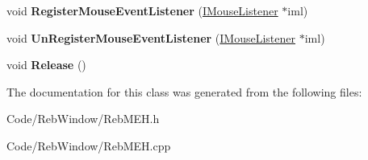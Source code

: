 \begin{DoxyCompactItemize}
\item 
void {\bfseries Register\+Mouse\+Event\+Listener} (\hyperlink{class_i_mouse_listener}{I\+Mouse\+Listener} $\ast$iml)\hypertarget{class_reb_m_e_h_a88ac59553812364462912bc763788760}{}\label{class_reb_m_e_h_a88ac59553812364462912bc763788760}

\item 
void {\bfseries Un\+Register\+Mouse\+Event\+Listener} (\hyperlink{class_i_mouse_listener}{I\+Mouse\+Listener} $\ast$iml)\hypertarget{class_reb_m_e_h_a77953a2792362bd7f0f9f2a6b9e85e44}{}\label{class_reb_m_e_h_a77953a2792362bd7f0f9f2a6b9e85e44}

\item 
void {\bfseries Release} ()\hypertarget{class_reb_m_e_h_a2d3ccea063b101680c303c6dddbd1aad}{}\label{class_reb_m_e_h_a2d3ccea063b101680c303c6dddbd1aad}

\end{DoxyCompactItemize}


The documentation for this class was generated from the following files\+:\begin{DoxyCompactItemize}
\item 
Code/\+Reb\+Window/Reb\+M\+E\+H.\+h\item 
Code/\+Reb\+Window/Reb\+M\+E\+H.\+cpp\end{DoxyCompactItemize}
